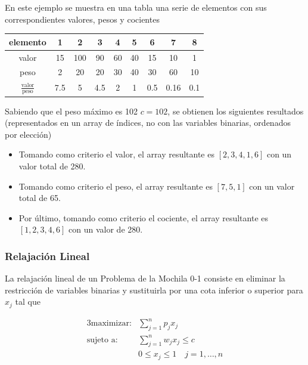 \begin{ejemplo}
    En este ejemplo se muestra en una tabla una serie de elementos con sus correspondientes valores, pesos y cocientes
    
    \begin{center}
        \begin{tabular}{c|cccccccc}
            \hline
            elemento & 1 & 2 & 3 & 4 & 5 & 6 & 7 & 8 \\ \hline
            valor & 15 & 100 & 90 & 60 & 40 & 15 & 10 & 1 \\
            peso & 2 & 20 & 20 & 30 & 40 & 30 & 60 & 10 \\ \hline
            $\frac{\text{valor}}{\text{peso}}$ & 7.5 & 5 & 4.5 & 2 & 1 & 0.5 & 0.16 & 0.1 \\
            \hline
        \end{tabular}
    \end{center}

    Sabiendo que el peso máximo es 102 $c=102$, se obtienen los siguientes resultados (representados en un array de
    índices, no con las variables binarias, ordenados por elección)

    \begin{itemize}
        \item Tomando como criterio el valor, el array resultante es $[2, 3, 4, 1, 6]$ con un valor total de 280.
        \item Tomando como criterio el peso, el array resultante es $[7, 5, 1]$ con un valor total de 65.
        \item Por último, tomando como criterio el cociente, el array resultante es $[1, 2, 3, 4, 6]$ con un valor de 280.
    \end{itemize}
\end{ejemplo}

\subsubsection{Relajación Lineal}

La relajación lineal de un Problema de la Mochila 0-1 consiste en eliminar la restricción de variables binarias y sustituirla
por una cota inferior o superior para $x_j$ tal que 

\begin{alignat}{3}
    \text{maximizar:}   &   \sum_{j=1}^n p_jx_j       \\
    \text{sujeto a:}    &   \sum_{j=1}^n w_jx_j\leq c \\
                        &   0\leq x_j\leq 1 \quad j=1,\dots,n
\end{alignat}

